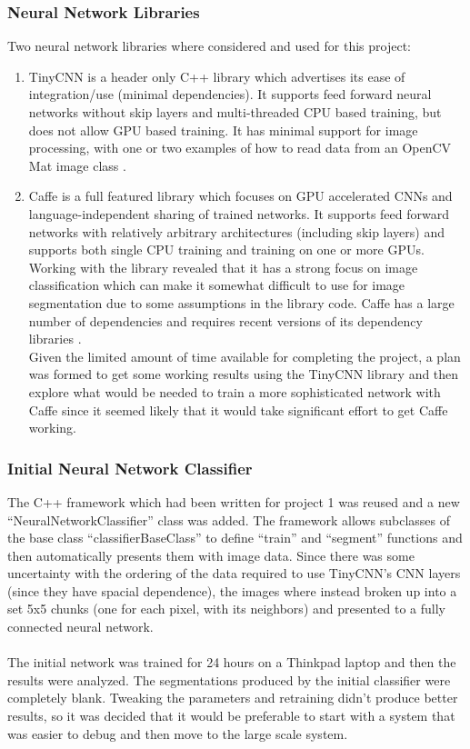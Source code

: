 \documentclass[12pt]{article}
\begin{document}
\subsubsection{Neural Network Libraries}
	Two neural network libraries where considered and used for this project:\\
\begin{enumerate}
	\item TinyCNN is a header only C++ library which advertises its ease of integration/use (minimal dependencies).  It supports feed forward neural networks without skip layers and  multi-threaded CPU based training, but does not allow GPU based training.  It has minimal support for image processing, with one or two examples of how to read data from an OpenCV Mat image class \cite{tinyCNN}.  \\
	\item Caffe is a full featured library which focuses on GPU accelerated CNNs and language-independent sharing of trained networks.  It supports feed forward networks with relatively arbitrary architectures (including skip layers) and supports both single CPU training and training on one or more GPUs.  Working with the library revealed that it has a strong focus on image classification which can make it somewhat difficult to use for image segmentation due to some assumptions in the library code.  Caffe has a large number of dependencies and requires recent versions of its dependency libraries \cite{caffe}.\\
	Given the limited amount of time available for completing the project, a plan was formed to get some working results using the TinyCNN library and then explore what would be needed to train a more sophisticated network with Caffe since it seemed likely that it would take significant effort to get Caffe working.
\end{enumerate}
\subsubsection{Initial Neural Network Classifier}
	The C++ framework which had been written for project 1 was reused and a new “NeuralNetworkClassifier” class was added.  The framework allows subclasses of the base class “classifierBaseClass” to define “train” and “segment” functions and then automatically presents them with image data.  Since there was some uncertainty with the ordering of the data required to use TinyCNN's CNN layers (since they have spacial dependence), the images where instead broken up into a set 5x5 chunks (one for each pixel, with its neighbors) and presented to a fully connected neural network.\\
\\
	The initial network was trained for 24 hours on a Thinkpad laptop and then the results were analyzed.  The segmentations produced by the initial classifier were completely blank.  Tweaking the parameters and retraining didn't produce better results, so it was decided that it would be preferable to start with a system that was easier to debug and then move to the large scale system.
\end{document}

